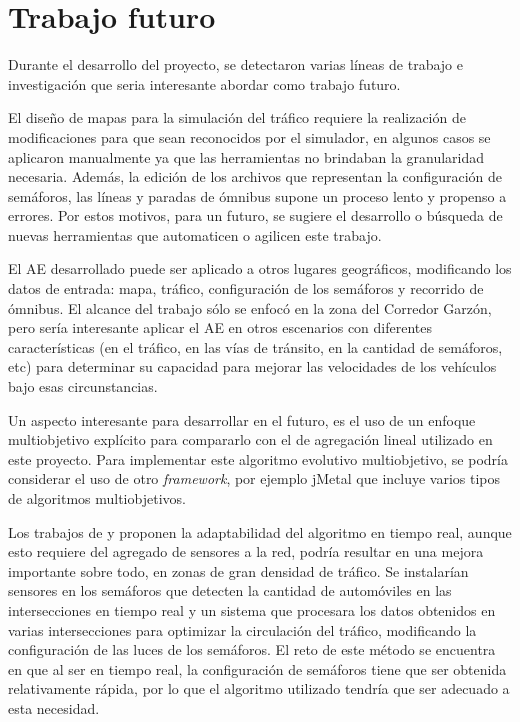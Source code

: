 \section{Trabajo futuro}
Durante el desarrollo del proyecto, se detectaron varias líneas de trabajo e investigación que seria interesante abordar como trabajo futuro.

El diseño de mapas para la simulación del tráfico requiere la realización de modificaciones para que sean reconocidos por el simulador, en algunos casos se aplicaron manualmente ya que las herramientas no brindaban la granularidad necesaria. Además, la edición de los archivos que representan la configuración de semáforos, las líneas y paradas de ómnibus supone un proceso lento y propenso a errores. Por estos motivos, para un futuro, se sugiere el desarrollo o búsqueda de nuevas herramientas que automaticen o agilicen este trabajo.

El AE desarrollado puede ser aplicado a otros lugares geográficos, modificando  los datos de entrada: mapa, tráfico, configuración de los semáforos y recorrido de ómnibus. El alcance del trabajo sólo se enfocó en la zona del Corredor Garzón, pero sería interesante aplicar el AE en otros escenarios con diferentes características (en el tráfico, en las vías de tránsito, en la cantidad de semáforos, etc) para determinar su capacidad para mejorar las velocidades de los vehículos bajo esas circunstancias.

Un aspecto interesante para desarrollar en el futuro, es el uso de un enfoque multiobjetivo explícito para compararlo con el de agregación lineal utilizado en este proyecto. Para implementar este algoritmo evolutivo multiobjetivo, se podría considerar el uso de otro \emph{framework}, por ejemplo jMetal que incluye varios tipos de algoritmos multiobjetivos.

Los trabajos de  \citet{Montana1996} y \citet{Vogel2000} proponen la adaptabilidad del algoritmo en tiempo real, aunque esto requiere del agregado de sensores a la red, podría resultar en una mejora importante sobre todo, en zonas de gran densidad de tráfico. Se instalarían sensores en los semáforos que detecten la cantidad de automóviles en las intersecciones en tiempo real y un sistema que procesara los datos obtenidos en varias intersecciones para optimizar la circulación del tráfico, modificando la configuración de las luces de los semáforos. El reto de este método se encuentra en que al ser en tiempo real, la configuración de semáforos tiene que ser obtenida relativamente rápida, por lo que el algoritmo utilizado tendría que ser adecuado a esta necesidad.

